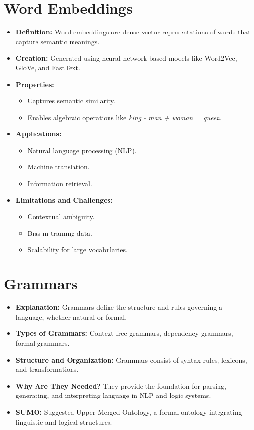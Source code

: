 \documentclass[english,version-2020-11]{uzl-thesis}
\begin{document}
  \section{Word Embeddings}
    \begin{itemize}
        \item \textbf{Definition:} Word embeddings are dense vector representations of words that capture semantic meanings.
        \item \textbf{Creation:} Generated using neural network-based models like Word2Vec, GloVe, and FastText.
        \item \textbf{Properties:}
          \begin{itemize}
              \item Captures semantic similarity.
              \item Enables algebraic operations like \textit{king - man + woman = queen}.
          \end{itemize}
        \item \textbf{Applications:}
          \begin{itemize}
              \item Natural language processing (NLP).
              \item Machine translation.
              \item Information retrieval.
          \end{itemize}
        \item \textbf{Limitations and Challenges:}
          \begin{itemize}
              \item Contextual ambiguity.
              \item Bias in training data.
              \item Scalability for large vocabularies.
          \end{itemize}
    \end{itemize}

  \section{Grammars}
    \begin{itemize}
        \item \textbf{Explanation:} Grammars define the structure and rules governing a language, whether natural or formal.
        \item \textbf{Types of Grammars:} Context-free grammars, dependency grammars, formal grammars.
        \item \textbf{Structure and Organization:} Grammars consist of syntax rules, lexicons, and transformations.
        \item \textbf{Why Are They Needed?} They provide the foundation for parsing, generating, and interpreting language in NLP and logic systems.
        \item \textbf{SUMO:} Suggested Upper Merged Ontology, a formal ontology integrating linguistic and logical structures.
    \end{itemize}
\end{document}
